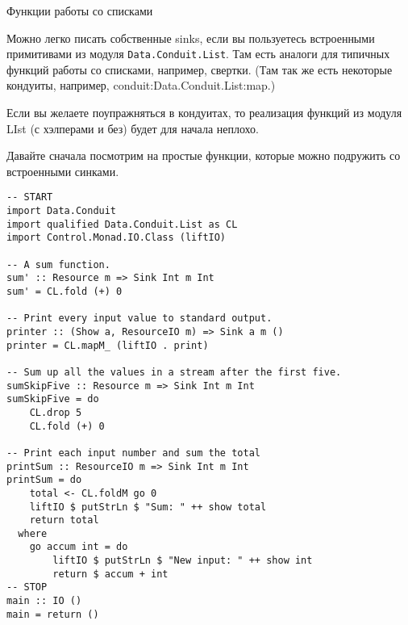 % 
%
Функции работы со списками

Можно легко писать собственные sinks, если вы пользуетесь встроенными примитивами из
модуля \verb*|Data.Conduit.List|. Там есть аналоги для типичных функций работы со
списками, например, свертки. (Там так же есть некоторые кондуиты,
например, conduit:Data.Conduit.List:map.)

Если вы желаете поупражняться в кондуитах, то реализация функций из модуля LIst (с
хэлперами и без) будет для начала неплохо.

Давайте сначала посмотрим на простые функции, которые можно подружить со встроенными
синками.
\begin{lstlisting}
-- START
import Data.Conduit
import qualified Data.Conduit.List as CL
import Control.Monad.IO.Class (liftIO)

-- A sum function.
sum' :: Resource m => Sink Int m Int
sum' = CL.fold (+) 0

-- Print every input value to standard output.
printer :: (Show a, ResourceIO m) => Sink a m ()
printer = CL.mapM_ (liftIO . print)

-- Sum up all the values in a stream after the first five.
sumSkipFive :: Resource m => Sink Int m Int
sumSkipFive = do
    CL.drop 5
    CL.fold (+) 0

-- Print each input number and sum the total
printSum :: ResourceIO m => Sink Int m Int
printSum = do
    total <- CL.foldM go 0
    liftIO $ putStrLn $ "Sum: " ++ show total
    return total
  where
    go accum int = do
        liftIO $ putStrLn $ "New input: " ++ show int
        return $ accum + int
-- STOP
main :: IO ()
main = return ()
\end{lstlisting}

